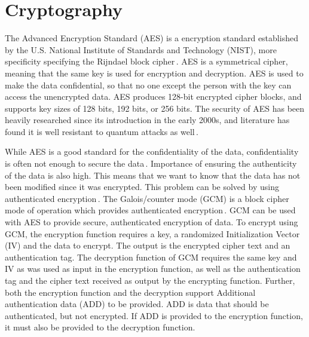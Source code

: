 \section{Cryptography}
\label{sec:back_crypto}
The Advanced Encryption Standard (\gls{AES}) is a encryption standard established by the U.S. National Institute of Standards and Technology (NIST), more specificity specifying the Rijndael block cipher\,\cite{kumarvermaPerformanceAnalysisRC62012}. AES is a symmetrical cipher, meaning that the same key is used for encryption and decryption. AES is used to make the data confidential, so that no one except the person with the key can access the unencrypted data. AES produces 128-bit encrypted cipher blocks, and supports key sizes of 128 bits, 192 bits, or 256 bits. The security of AES has been heavily researched since its introduction in the early 2000s, and literature has found it is well resistant to quantum attacks as well\,\cite{bonnetainQuantumSecurityAnalysis2019}.

While AES is a good standard for the confidentiality of the data, confidentiality is often not enough to secure the data\,\cite{rosswallrabensteinWhenItComes2021}. Importance of ensuring the authenticity of the data is also high. This means that we want to know that the data has not been modified since it was encrypted. This problem can be solved by using authenticated encryption\,\cite{khovratovichAnswerWhyShould2013}. The Galois/counter mode (\gls{GCM}) is a block cipher mode of operation which provides authenticated encryption\,\cite{mcgrewGaloisCounterMode2004}. GCM can be used with AES to provide secure, authenticated encryption of data. To encrypt using GCM, the encryption function requires a key, a randomized Initialization Vector (IV) and the data to encrypt. The output is the encrypted cipher text and an authentication tag. The decryption function of GCM requires the same key and IV as was used as input in the encryption function, as well as the authentication tag and the cipher text received as output by the encrypting function. Further, both the encryption function and the decryption support Additional authentication data (ADD) to be provided. ADD is data that should be authenticated, but not encrypted. If ADD is provided to the encryption function, it must also be provided to the decryption function.


